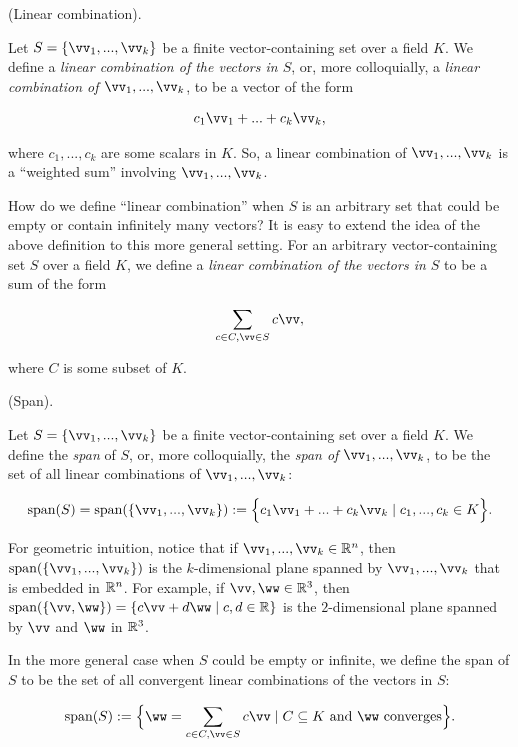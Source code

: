 \begin{defn}
    (Linear combination).
    
    Let $S = \{\vv_1, ..., \vv_k\}$ be a finite vector-containing set over a field $K$. We define a \textit{linear combination of the vectors in $S$}, or, more colloquially, a \textit{linear combination of $\vv_1, ..., \vv_k$}, to be a vector of the form
    
    \begin{align*}
        c_1 \vv_1 + ... + c_k \vv_k,
    \end{align*}
    
    where $c_1, ..., c_k$ are some scalars in $K$. So, a linear combination of $\vv_1, ..., \vv_k$ is a ``weighted sum'' involving $\vv_1, ..., \vv_k$.
    
    How do we define ``linear combination'' when $S$ is an arbitrary set that could be empty or contain infinitely many vectors? It is easy to extend the idea of the above definition to this more general setting. For an arbitrary vector-containing set $S$ over a field $K$, we define a \textit{linear combination of the vectors in $S$} to be a sum of the form
    
    \begin{align*}
        \sum_{c \in C, \vv \in S} c \vv,
    \end{align*}
    
    where $C$ is some subset of $K$.
\end{defn}

\begin{defn}
    (Span).
    
    Let $S = \{\vv_1, ..., \vv_k\}$ be a finite vector-containing set over a field $K$. We define the \textit{span} of $S$, or, more colloquially, the \textit{span of $\vv_1, ..., \vv_k$}, to be the set of all linear combinations of $\vv_1, ..., \vv_k$:
    
     \begin{align*}
        \spann(S) = \spann(\{\vv_1, ..., \vv_k\}) := \Big\{ c_1 \vv_1 + ... + c_k \vv_k \mid c_1, ..., c_k \in K \Big\}.
    \end{align*}
    
    For geometric intuition, notice that if $\vv_1, ..., \vv_k \in \R^n$, then $\spann(\{\vv_1, ..., \vv_k\})$ is the $k$-dimensional plane spanned by $\vv_1, ..., \vv_k$ that is embedded in $\mathbb{R}^n$. For example, if $\vv, \ww \in \R^3$, then ${\spann(\{\vv, \ww\}) = \{ c \vv + d \ww \mid c, d \in \R \}}$ is the $2$-dimensional plane spanned by $\vv$ and $\ww$ in $\mathbb{R}^3$.
    
    In the more general case when $S$ could be empty or infinite, we define the span of $S$ to be the set of all convergent linear combinations of the vectors in $S$:
    
    \begin{align*}
        \spann(S) := \Big\{ \ww = \sum_{c \in C, \vv \in S} c \vv \mid C \subseteq K \text{ and $\ww$ converges} \Big\}.
    \end{align*}
\end{defn}

